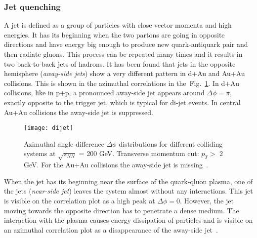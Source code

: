       \subsubsection{Jet quenching}
        A jet is defined as a group of particles with close vector momenta and high energies.
        It has its beginning when the two partons are going in opposite directions and have energy big enough to produce new quark-antiquark pair and then radiate gluons.
        This process can be repeated many times and it results in two back-to-back jets of hadrons.
        It has been found that jets in the opposite hemisphere (\textit{away-side jets}) show a very different pattern in d+Au and Au+Au collisions.
        This is shown in the azimuthal correlations in the~Fig.~\ref{fig:di-jet}.
        In d+Au collisions, like in p+p, a pronounced away-side jet appears around $\Delta \phi = \pi$, exactly opposite to the trigger jet, which is typical for di-jet events.
        In central Au+Au collisions the away-side jet is suppressed. 
        \begin{figure}[b]
          \centering
          \texttt{[image: dijet]}
          \caption{Azimuthal angle difference $\Delta \phi$ distributions for different colliding systems at $\sqrt{s_{NN}}$ = 200 GeV. Transverse momentum cut: $p_T >$ 2 GeV. For the Au+Au collisions the away-side jet is missing~\cite{rhic_jets}.}
          \label{fig:di-jet}
        \end{figure}
        When the jet has its beginning near the surface of the quark-qluon plasma, one of the jets (\textit{near-side jet}) leaves the system almost without any interactions.
        This jet is visible on the correlation plot as a high peak at $\Delta \phi = 0$.
        However, the jet moving towards the opposite direction has to penetrate a dense medium.
        The interaction with the plasma causes energy dissipation of particles and is visible on an azimuthal correlation plot as a disappearance of the away-side jet~\cite{bartke}.

